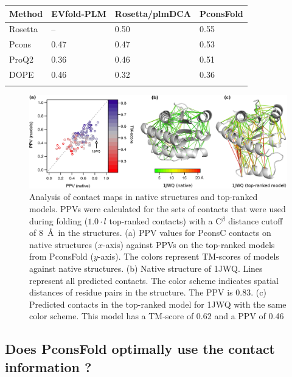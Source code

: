 \documentclass{bioinfo}
\begin{document}
\begin{table}[!t]
{\begin{tabular}{llll}\toprule
Method & EVfold-PLM & Rosetta/plmDCA& PconsFold  \\ \midrule
Rosetta & -- & 0.50 & 0.55 \\
Pcons & 0.47 & 0.47 & 0.53 \\
ProQ2 & 0.36 & 0.46 & 0.51 \\
DOPE & 0.46 & 0.32 & 0.36 \\ \botrule
\end{tabular}}{}
\end{table}

\begin{figure}[!tpb]%
\centerline{\includegraphics[scale=0.7]{figures/qa.eps}}
\caption{Analysis of contact maps in native structures and
top-ranked models. PPVs were calculated for the sets of contacts that
were used during folding ($1.0 \cdot l$ top-ranked contacts) with a
C$^\beta$ distance cutoff of 8~\AA\ in the structures. (a) PPV values for PconsC contacts on native structures 
($x$-axis) against PPVs on the top-ranked models from PconsFold 
($y$-axis). The colors represent TM-scores of models against native
structures. (b) Native structure of 1JWQ. Lines represent all predicted contacts. The color 
scheme indicates spatial distances of residue pairs in the 
structure. The PPV is 0.83. (c) Predicted contacts in the top-ranked 
model for 1JWQ with the same color scheme. This model has a TM-score 
of 0.62 and a PPV of 0.46}\label{fig:qa}
\end{figure}

\subsection{Does PconsFold optimally use the contact information ? }
\end{document}
